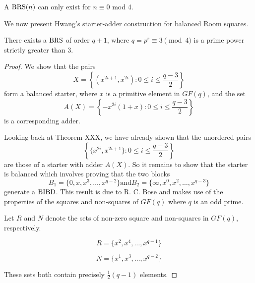 \begin{corollary}
A $\operatorname{BRS}(n)$ can only exist for $n \equiv 0$ mod 4.
\end{corollary}

We now present Hwang’s starter-adder construction for balanced Room squares.

\begin{theorem}
\label{thm:hwang}
There exists a $\operatorname{BRS}$ of order $q+1$, where $q = p^r \equiv 3\pmod 4$ is a prime power strictly greater than 3.
\end{theorem}

\begin{proof}
We show that the pairs
\begin{equation}
X = \left\{(x^{2i + 1}, x^{2i}): 0 \leq i \leq \frac{q - 3}{2} \right\}
\end{equation}
form a balanced starter, where $x$ is a primitive element in $GF(q)$, and the set
\begin{equation}
A(X) = \left\{-x^{2i}(1 + x): 0 \leq i \leq \frac{q - 3}{2} \right\}
\end{equation}
is a corresponding adder.

Looking back at Theorem XXX, we have already shown that the unordered pairs
\begin{equation}
\left\{\{x^{2i}, x^{2i + 1}\}: 0 \leq i \leq \frac{q - 3}{2} \right\}
\end{equation}
are those of a starter with adder $A(X)$.
So it remains to show that the starter is balanced which involves proving that the two blocks
\begin{equation}
B_1 = \{0, x, x^3, \ldots, x^{q - 2}\} \mathrm{and} B_2 = \{\infty, x^0, x^2, \ldots, x^{q - 3}\}
\end{equation}
generate a $\operatorname{BIBD}$.
This result is due to R. C. Bose and makes use of the properties of the squares and non-squares of $GF(q)$ where $q$ is an odd prime.

Let $R$ and $N$ denote the sets of non-zero square and non-squares in $GF(q)$, respectively.

\begin{equation}
R = \{x^2, x^4, \ldots, x^{q - 1}\}
\end{equation}

\begin{equation}
N = \{x^1, x^3, \ldots, x^{q - 2}\}
\end{equation}

These sets both contain precisely $\frac{1}{2}(q - 1)$ elements.


\end{proof}

